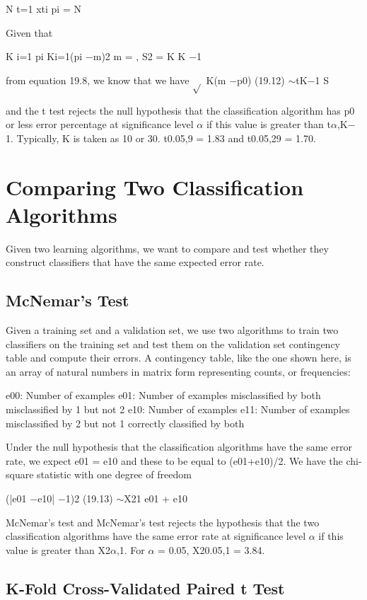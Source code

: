 N t=1 xti pi = N

Given that

K i=1 pi Ki=1(pi $-$m)2 m = , S2 = K K $-$1

from equation 19.8, we know that we have $\sqrt{}$ K(m $-$p0) (19.12) $\sim$tK$-$1 S

and the t test rejects the null hypothesis that the classification algorithm has p0 or less error percentage at significance level $\alpha$ if this value is greater than t$\alpha$,K$-$1. Typically, K is taken as 10 or 30. t0.05,9 = 1.83 and t0.05,29 = 1.70.

\section{Comparing Two Classification Algorithms}

Given two learning algorithms, we want to compare and test whether they construct classifiers that have the same expected error rate.

\subsection{McNemar’s Test}

Given a training set and a validation set, we use two algorithms to train two classifiers on the training set and test them on the validation set contingency table and compute their errors. A contingency table, like the one shown here, is an array of natural numbers in matrix form representing counts, or frequencies:

e00: Number of examples e01: Number of examples misclassified by both misclassified by 1 but not 2 e10: Number of examples e11: Number of examples misclassified by 2 but not 1 correctly classified by both

Under the null hypothesis that the classification algorithms have the same error rate, we expect e01 = e10 and these to be equal to (e01+e10)/2. We have the chi-square statistic with one degree of freedom

(|e01 $-$e10| $-$1)2 (19.13) $\sim$X21 e01 + e10

McNemar’s test and McNemar’s test rejects the hypothesis that the two classification algorithms have the same error rate at significance level $\alpha$ if this value is greater than X2$\alpha$,1. For $\alpha$ = 0.05, X20.05,1 = 3.84.

\subsection{K-Fold Cross-Validated Paired t Test}

